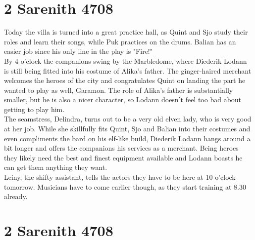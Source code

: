 \section{2 Sarenith 4708}

Today the villa is turned into a great practice hall, as Quint and Sjo study their roles and learn their songs, while Puk practices on the drums. Balian has an easier job since his only line in the play is "Fire!"\\

By 4 o'clock the companions swing by the Marbledome, where Diederik Lodann is still being fitted into his costume of Alika's father. The ginger-haired merchant welcomes the heroes of the city and congratulates Quint on landing the part he wanted to play as well, Garamon. The role of Alika's father is substantially smaller, but he is also a nicer character, so Lodann doesn't feel too bad about getting to play him.\\

The seamstress, Delindra, turns out to be a very old elven lady, who is very good at her job. While she skillfully fits Quint, Sjo and Balian into their costumes and even compliments the bard on his elf-like build, Diederik Lodann hangs around a bit longer and offers the companions his services as a merchant. Being heroes they likely need the best and finest equipment available and Lodann boasts he can get them anything they want.\\

Leiny, the shifty assistant, tells the actors they have to be here at 10 o'clock tomorrow. Musicians have to come earlier though, as they start training at 8.30 already.\\

\section{2 Sarenith 4708}

